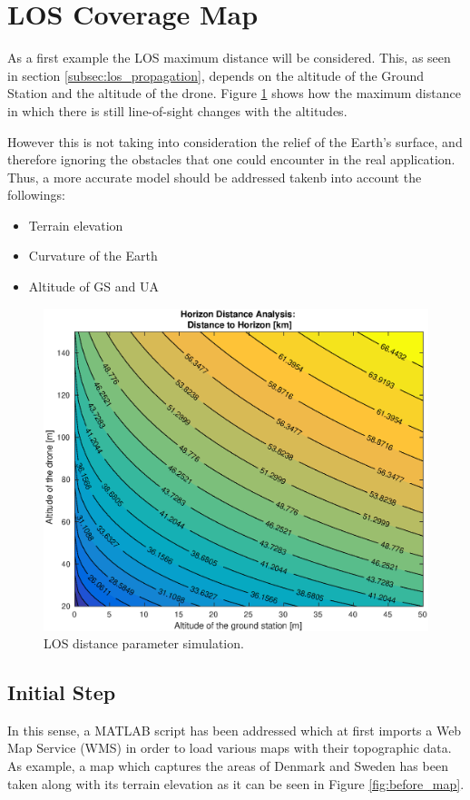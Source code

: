 \section{LOS Coverage Map}\label{sec:los_map}
As a first example the LOS maximum distance will be considered. This, as seen in section \ref{subsec:los_propagation}, depends on the altitude of the Ground Station and the altitude of the drone. Figure \ref{fig:altitude2distance} shows how the maximum distance in which there is still line-of-sight changes with the altitudes.

However this is not taking into consideration the relief of the Earth's surface, and therefore ignoring the obstacles that one could encounter in the real application. Thus, a more accurate model should be addressed takenb into account the followings:

\begin{itemize}
  \item Terrain elevation
  \item Curvature of the Earth
  \item Altitude of GS and UA
\end{itemize}

\begin{figure}[H]
  \centering
  \includegraphics[scale=0.65]{figures/altitude2distance.eps}
  \caption{LOS distance parameter simulation.}
    \label{fig:altitude2distance}
\end{figure}

\subsection{Initial Step}
In this sense, a MATLAB script has been addressed which at first imports a Web Map Service (WMS) in order to load various maps with their topographic data. As example, a map which captures the areas of Denmark and Sweden has been taken along with its terrain elevation as it can be seen in Figure \ref{fig:before_map}.

